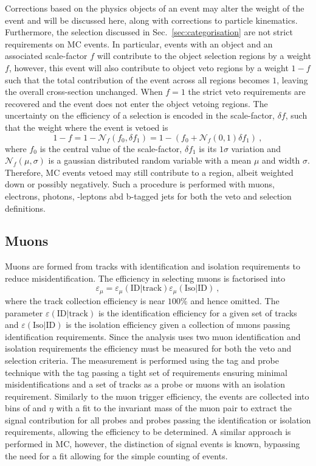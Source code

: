 Corrections based on the physics objects of an event may alter the weight of
the event and will be discussed here, along with corrections to particle
kinematics. Furthermore, the selection discussed in
Sec.~\ref{sec:categorisation} are not strict requirements on MC events. In
particular, events with an object and an associated scale-factor $f$ will
contribute to the object selection regions by a weight $f$, however, this
event will also contribute to object veto regions by a weight $1-f$ such that
the total contribution of the event across all regions becomes $1$, leaving
the overall cross-section unchanged. When $f=1$ the strict veto requirements
are recovered and the event does not enter the object vetoing regions. The
uncertainty on the efficiency of a selection is encoded in the scale-factor,
$\delta f$, such that the weight where the event is vetoed is
%
\begin{equation}
    1 - f = 1 - \mathcal{N}_f(f_0,\delta f_1) = 1 - (f_0 + \mathcal{N}_f(0,1)\delta f_1)\ ,
\end{equation}
%
where $f_0$ is the central value of the scale-factor, $\delta f_1$ is its
$1\sigma$ variation and $\mathcal{N}_f(\mu,\sigma)$ is a gaussian distributed
random variable with a mean $\mu$ and width $\sigma$. Therefore, MC events
vetoed may still contribute to a region, albeit weighted down or possibly
negatively. Such a procedure is performed with muons, electrons, photons,
\Ptauh-leptons abd b-tagged jets for both the veto and selection definitions.


\subsection{Muons}

Muons are formed from tracks with identification and isolation requirements to
reduce misidentification. The efficiency in selecting muons is factorised into
%
\begin{equation}
    \varepsilon_{\mu} = \varepsilon_{\mu}(\mathrm{ID}|\mathrm{track}) \varepsilon_{\mu}(\mathrm{Iso}|\mathrm{ID})\ ,
\end{equation}
%
where the track collection efficiency is near $100\%$ and hence omitted. The
parameter $\varepsilon(\mathrm{ID}|\mathrm{track})$ is the identification
efficiency for a given set of tracks and
$\varepsilon(\mathrm{Iso}|\mathrm{ID})$ is the isolation efficiency given a
collection of muons passing identification requirements. Since the analysis
uses two muon identification and isolation requirements the efficiency must be
measured for both the veto and selection criteria. The measurement is
performed using the tag and probe technique with the tag passing a tight set
of requirements ensuring minimal misidentifications and a set of tracks as a
probe or muons with an isolation requirement. Similarly to the muon trigger
efficiency, the events are collected into bins of \pt and $\eta$ with a fit to
the invariant mass of the muon pair to extract the signal contribution for all
probes and probes passing the identification or isolation requirements,
allowing the efficiency to be determined. A similar approach is performed in
MC, however, the distinction of signal events is known, bypassing the need for
a fit allowing for the simple counting of events.

